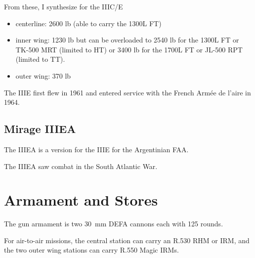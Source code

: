 {    From these, I synthesize for the IIIC/E
    \begin{itemize}
        \item centerline: 2600 lb (able to carry the 1300L FT)
        \item inner wing: 1230 lb but can be overloaded to 2540 lb for the 1300L FT or TK-500 MRT (limited to HT) or 3400 lb for the 1700L FT or JL-500 RPT (limited to TT).
        \item outer wing: 370 lb
    \end{itemize}

}

The IIIE first flew in 1961 and entered service with the French Armée de l'aire in 1964.%

\subsection{Mirage IIIEA}

The IIIEA is a version for the IIIE for the Argentinian FAA.%

The IIIEA saw combat in the South Atlantic War.%

\section{Armament and Stores}

The gun armament is two 30~mm DEFA cannons each with 125 rounds.%

For air-to-air missions, the central station can carry an R.530 RHM or IRM, and the two outer wing stations can carry R.550 Magic IRMs.

